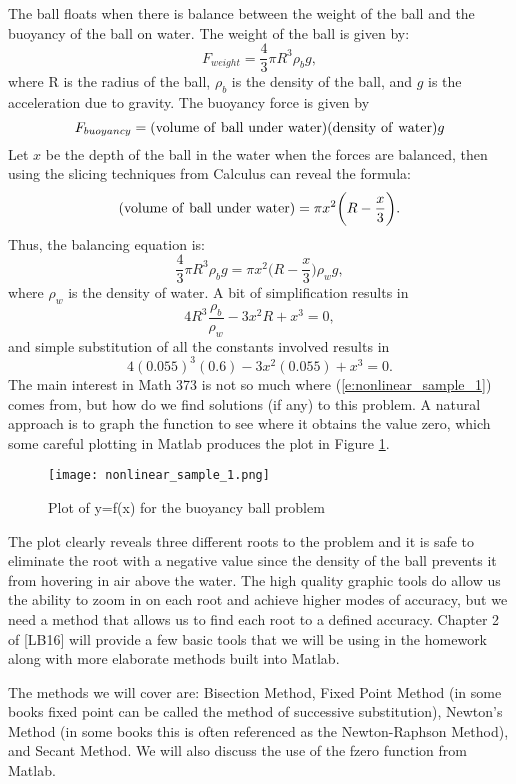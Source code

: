 \documentclass[twoside]{article}
\renewcommand{\cite}[1]{[#1]}
\def\ds{\displaystyle}
\begin{document}
The ball floats when there is balance between the weight of the ball and the buoyancy of the ball on water. The weight of the ball is given by:
$$F_{weight} = \frac 43 \pi R^3 \rho _b g, $$
where R is the radius of the ball, $\ds \rho_b$ is the density of the ball, and $g$ is the acceleration due to gravity. The buoyancy force is given by
$$F_{buoyancy} = ({\rm volume \ of \ ball \ under \ water}) ({\rm density \ of \ water})g$$
Let $x$ be the depth of the ball in the water when the forces are balanced, then using the slicing techniques from Calculus can reveal the formula:
$$({\rm volume \ of \ ball \ under \ water}) = \pi x^2\biggr ( R-\frac x3 \biggr ). $$
Thus, the balancing equation is:
$$\frac 43 \pi R^3 \rho_b g = \pi x^2 \biggr ( R-\frac x3 \biggr ) \rho_w g,$$
where $\ds \rho_w$ is the density of water. A bit of simplification results in 
$$4 R^3 \frac {\rho_b}{\rho_w}-3x^2R+x^3 = 0,$$
and simple substitution of all the constants involved results in
\begin{equation}
4(0.055)^3(0.6)-3x^2(0.055)+x^3=0.    
    \label{e:nonlinear_sample_1}
\end{equation}
The main interest in Math 373 is not so much where (\ref{e:nonlinear_sample_1}) comes from, but how do we find solutions (if any) to this problem. A natural approach is to graph the function to see where it obtains the value zero, which some careful plotting in Matlab produces the plot in Figure \ref{f:nonlinear_sample_1}. 
\begin{figure}[!ht]
\centering
\texttt{[image: nonlinear\_sample\_1.png]}
 \caption{Plot of y=f(x) for the buoyancy ball problem}
 \label{f:nonlinear_sample_1}
\end{figure}
The plot clearly reveals three different roots to the problem and it is safe to eliminate the root with a negative value since the density of the ball prevents it from hovering in air above the water. The high quality graphic tools do allow us the ability to zoom in on each root and achieve higher modes of accuracy, but we need a method that allows us to find each root to a defined accuracy. Chapter 2 of \cite{LB16} will provide a few basic tools that we will be using in the homework along with more elaborate methods built into Matlab. \par
The methods we will cover are: Bisection Method, Fixed Point Method (in some books fixed point can be called the method of successive substitution), Newton's Method (in some books this is often referenced as the Newton-Raphson Method), and Secant Method. We will also discuss the use of the fzero function from Matlab. 
\end{document}
